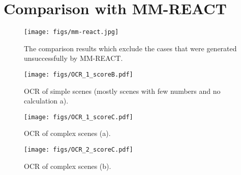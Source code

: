 \documentclass{article}
\begin{document}
\section{Comparison with MM-REACT}
\begin{figure}[!ht]
     \centering
     \texttt{[image: figs/mm-react.jpg]}
     \caption{The comparison results which exclude the cases that were generated unsuccessfully by MM-REACT.}
     \label{fig:mm-react}
     \vspace{-2mm}
\end{figure}




























\begin{figure}[!ht]
    \centering
    \texttt{[image: figs/OCR\_1\_scoreB.pdf]}
    \caption{OCR of simple scenes (mostly scenes with few numbers and no calculation a).}
    \label{fig:OCR_1_scoreB}
    \vspace{-2mm}
\end{figure}

\begin{figure}[!ht]
    \centering
    \texttt{[image: figs/OCR\_1\_scoreC.pdf]}
    \caption{OCR of complex scenes (a).}
    \label{fig:OCR_1_scoreC_a}
    \vspace{-2mm}
\end{figure}

\begin{figure}[!ht]
    \centering
    \texttt{[image: figs/OCR\_2\_scoreC.pdf]}
    \caption{OCR of complex scenes (b).}
    \label{fig:OCR_1_scoreC_b}
    \vspace{-2mm}
\end{figure}
\end{document}
